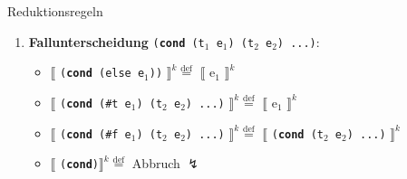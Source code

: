 \begin{contentbox}{Reduktionsregeln}
\begin{enumerate}
		      \vspace{-1em}
		      sonst \hfill {}
		      \vspace{-1em}
		      \begin{align*}
			      \llbracket \texttt{(f e$_1$ ... e$_n$)} \rrbracket^k
			      \overset{\text{def}}{=}
			      \llbracket(\llbracket \texttt{f}\rrbracket^{k+1} e_1 \dots e_n)\rrbracket^k
		      \end{align*}

		      \begin{errorbox}{Bitte beachten!}
			      Bei $\llbracket\text{\texttt{(\textbf{f} 1 2)}}\rrbracket^0$ weiß
			      man noch nicht, dass \texttt{\textbf{f}} eine $\lambda$-Abstraktion
			      ist. Man kann also \textbf{nicht} sofort
			      \texttt{\textbf{[apply\_$\lambda$]}} anwenden. Zuerst muss also
			       angewandt werden. Danach ,
			      dann . Erst dann lässt sich
			       darauf werfen.
		      \end{errorbox}

		\item \textbf{Fallunterscheidung} \texttt{(\textbf{cond} (t$_1$ e$_1$) (t$_2$ e$_2$) ...)}:
		      \begin{itemize}
			      \item $\llbracket$
			            \texttt{(\textbf{cond} (else e$_1$))}
			            $\rrbracket^k \overset{\text{def}}{=}$
			            $\llbracket$ e$_1$
			            $\rrbracket^k$ \hfill {}

			      \item $\llbracket$
			            \texttt{(\textbf{cond} (\#t e$_1$) (t$_2$ e$_2$) ...)}
			            $\rrbracket^k \overset{\text{def}}{=}$
			            $\llbracket$ e$_1$
			            $\rrbracket^k$ \hfill {}

			      \item $\llbracket$
			            \texttt{(\textbf{cond} (\#f e$_1$) (t$_2$ e$_2$) ...)}
			            $\rrbracket^k \overset{\text{def}}{=}$
			            $\llbracket$
			            \texttt{(\textbf{cond} (t$_2$ e$_2$) ...)} $\rrbracket^k$
			            \hfill {}

			      \item $\llbracket$
			            \texttt{(\textbf{cond})}$
				            \rrbracket^k \overset{\text{def}}{=}$
			            Abbruch $\lightning$ \hfill {}


\end{itemize}
\end{enumerate}
\end{contentbox}

